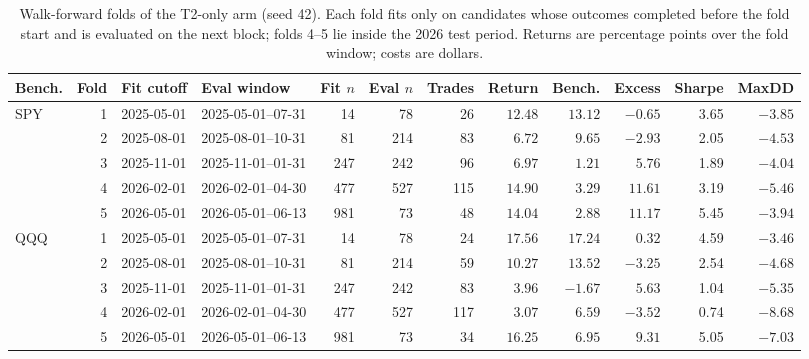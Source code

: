 \begin{table}[t]
\caption{Walk-forward folds of the T2-only arm (seed 42). Each fold fits only on candidates whose outcomes completed before the fold start and is evaluated on the next block; folds 4--5 lie inside the 2026 test period. Returns are percentage points over the fold window; costs are dollars.}
\label{tab:folds}
\centering
\scriptsize
\setlength{\tabcolsep}{2.6pt}
\begin{tabular}{lrllrrrrrrrr}
\toprule
Bench. & Fold & Fit cutoff & Eval window & Fit $n$ & Eval $n$ & Trades & Return & Bench. & Excess & Sharpe & MaxDD \\
\midrule
SPY & 1 & 2025-05-01 & 2025-05-01--07-31 & 14 & 78 & 26 & $12.48$ & $13.12$ & $-0.65$ & 3.65 & $-3.85$ \\
 & 2 & 2025-08-01 & 2025-08-01--10-31 & 81 & 214 & 83 & $6.72$ & $9.65$ & $-2.93$ & 2.05 & $-4.53$ \\
 & 3 & 2025-11-01 & 2025-11-01--01-31 & 247 & 242 & 96 & $6.97$ & $1.21$ & $5.76$ & 1.89 & $-4.04$ \\
 & 4 & 2026-02-01 & 2026-02-01--04-30 & 477 & 527 & 115 & $14.90$ & $3.29$ & $11.61$ & 3.19 & $-5.46$ \\
 & 5 & 2026-05-01 & 2026-05-01--06-13 & 981 & 73 & 48 & $14.04$ & $2.88$ & $11.17$ & 5.45 & $-3.94$ \\
\midrule
QQQ & 1 & 2025-05-01 & 2025-05-01--07-31 & 14 & 78 & 24 & $17.56$ & $17.24$ & $0.32$ & 4.59 & $-3.46$ \\
 & 2 & 2025-08-01 & 2025-08-01--10-31 & 81 & 214 & 59 & $10.27$ & $13.52$ & $-3.25$ & 2.54 & $-4.68$ \\
 & 3 & 2025-11-01 & 2025-11-01--01-31 & 247 & 242 & 83 & $3.96$ & $-1.67$ & $5.63$ & 1.04 & $-5.35$ \\
 & 4 & 2026-02-01 & 2026-02-01--04-30 & 477 & 527 & 117 & $3.07$ & $6.59$ & $-3.52$ & 0.74 & $-8.68$ \\
 & 5 & 2026-05-01 & 2026-05-01--06-13 & 981 & 73 & 34 & $16.25$ & $6.95$ & $9.31$ & 5.05 & $-7.03$ \\
\bottomrule
\end{tabular}
\end{table}
